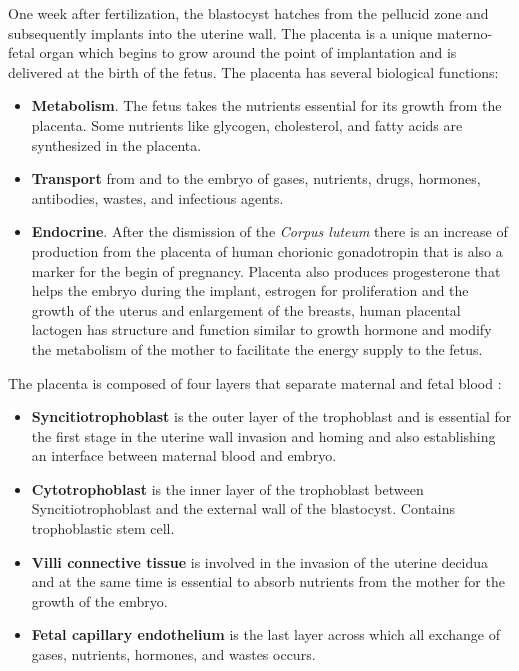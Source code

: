 One week after fertilization, the blastocyst hatches from the pellucid zone and subsequently implants into the uterine wall. The placenta is a unique materno-fetal organ which begins to grow around the point of implantation and is delivered at the birth of the fetus.
The placenta has several biological functions:
\begin{itemize}
    \item \textbf{Metabolism}. The fetus takes the nutrients essential for its growth from the placenta. Some nutrients like glycogen, cholesterol, and fatty acids are synthesized in the placenta.
    \item \textbf{Transport} from and to the embryo of gases, nutrients, drugs, hormones, antibodies, wastes, and infectious agents. 
    \item \textbf{Endocrine}. After the dismission of the \textit{Corpus luteum} there is an increase of production from the placenta of human chorionic gonadotropin that is also a marker for the begin of pregnancy. Placenta also produces progesterone that helps the embryo during the implant, estrogen for proliferation and the growth of the uterus and enlargement of the breasts, human placental lactogen has structure and function similar to growth hormone and modify the metabolism of the mother to facilitate the energy supply to the fetus.
\end{itemize}

The placenta is composed of four layers that separate maternal and fetal blood \cite{placenta}:
\begin{itemize}
    \item \textbf{Syncitiotrophoblast} is the outer layer of the trophoblast and is essential for the first stage in the uterine wall invasion and homing and also establishing an interface between maternal blood and embryo. 
    \item \textbf{Cytotrophoblast} is the inner layer of the trophoblast between Syncitiotrophoblast and the external wall of the blastocyst. Contains trophoblastic stem cell. 
    \item \textbf{Villi connective tissue} is involved in the invasion of the uterine decidua and at the same time is essential to absorb nutrients from the mother for the growth of the embryo.   
    \item \textbf{Fetal capillary endothelium} is the last layer across which all exchange of gases, nutrients, hormones, and wastes occurs.
\end{itemize}

